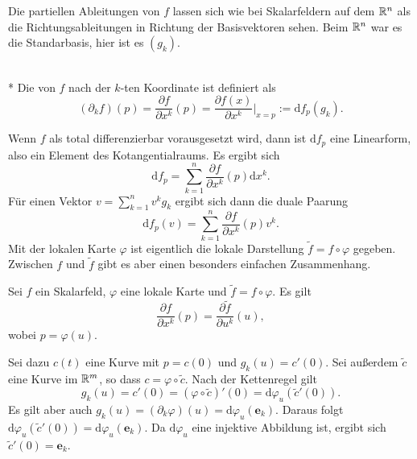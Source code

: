 Die partiellen Ableitungen von $f$ lassen sich wie bei Skalarfeldern
auf dem $\mathbb R^n$ als die Richtungsableitungen in Richtung der
Basisvektoren sehen. Beim $\mathbb R^n$ war es die Standarbasis, hier ist
es $(g_k)$.
\begin{definition}\mbox{}\\*
Die  von $f$ nach der $k$-ten Koordinate
ist definiert als
\begin{equation}
(\partial_k f)(p) = \frac{\partial f}{\partial x^k}(p)
= \frac{\partial f(x)}{\partial x^k}\Big|_{x=p} :=
\mathrm df_p(g_k).
\end{equation}
\end{definition}
Wenn $f$ als total differenzierbar vorausgesetzt wird, dann ist
$\mathrm df_p$ eine Linearform, also ein Element des
Kotangentialraums. Es ergibt sich
\begin{equation}
\mathrm df_p = \sum_{k=1}^n \frac{\partial f}{\partial x^k}(p)\mathrm dx^k.
\end{equation}
Für einen Vektor $v=\sum_{k=1}^n v^k g_k$ ergibt
sich dann die duale Paarung
\begin{equation}
\mathrm df_p(v) = \sum_{k=1}^n \frac{\partial f}{\partial x^k}(p)v^k.
\end{equation}
Mit der lokalen Karte $\varphi$ ist eigentlich die lokale
Darstellung $\tilde f=f\circ\varphi$ gegeben. Zwischen
$f$ und $\tilde f$ gibt es aber einen besonders einfachen Zusammenhang.
\begin{corollary}
Sei $f$ ein Skalarfeld, $\varphi$ eine lokale Karte und
$\tilde f=f\circ\varphi$. Es gilt%
\begin{equation}
\frac{\partial f}{\partial x^k}(p) = \frac{\partial\tilde f}{\partial u^k}(u),
\end{equation}
wobei $p=\varphi(u)$.
\end{corollary}
 Sei dazu $c(t)$ eine Kurve mit $p=c(0)$ und
$g_k(u)=c'(0)$. Sei außerdem $\tilde c$ eine Kurve im $\mathbb R^m$, so dass
$c=\varphi\circ \tilde c$. Nach der Kettenregel gilt
\begin{equation}
g_k(u) = c'(0) = (\varphi\circ\tilde c)'(0) = \mathrm d\varphi_u(\tilde c'(0)).
\end{equation}
Es gilt aber auch $g_k(u) = (\partial_k\varphi)(u) =
\mathrm d\varphi_u(\mathbf e_k)$. Daraus folgt
$\mathrm d\varphi_u(\tilde c'(0)) = \mathrm d\varphi_u(\mathbf e_k)$.
Da $\mathrm d\varphi_u$ eine injektive Abbildung ist, ergibt sich
$\tilde c'(0) = \mathbf e_k$.\;\qedsymbol

